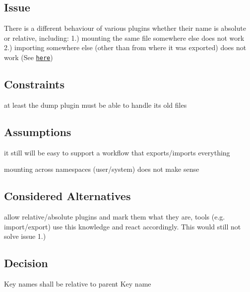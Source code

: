 \subsection*{Issue}

There is a different behaviour of various plugins whether their name is absolute or relative, including\+: 1.) mounting the same file somewhere else does not work 2.) importing somewhere else (other than from where it was exported) does not work (See \href{https://github.com/ElektraInitiative/libelektra/issues/51}{\tt here})

\subsection*{Constraints}


\begin{DoxyItemize}
\item at least the dump plugin must be able to handle its old files
\end{DoxyItemize}

\subsection*{Assumptions}


\begin{DoxyItemize}
\item it still will be easy to support a workflow that exports/imports everything
\item mounting across namespaces (user/system) does not make sense
\end{DoxyItemize}

\subsection*{Considered Alternatives}


\begin{DoxyItemize}
\item allow relative/absolute plugins and mark them what they are, tools (e.\+g. import/export) use this knowledge and react accordingly. This would still not solve issue 1.)
\end{DoxyItemize}

\subsection*{Decision}

Key names shall be relative to parent Key name

